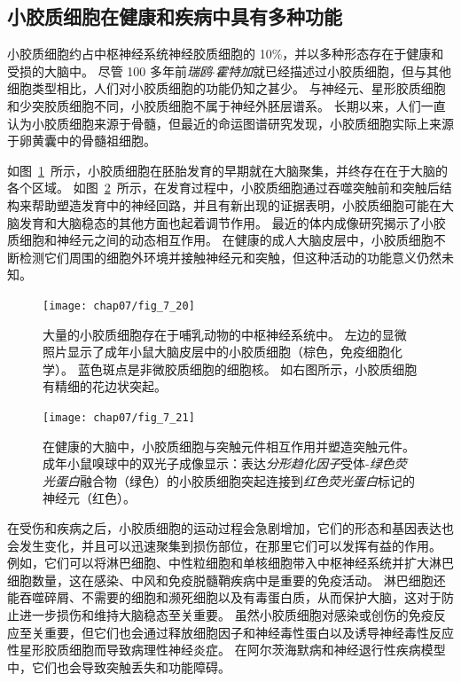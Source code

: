\subsection{小胶质细胞在健康和疾病中具有多种功能}

小胶质细胞约占中枢神经系统神经胶质细胞的 10\%，并以多种形态存在于健康和受损的大脑中。
尽管 100 多年前\textit{瑞鸥$\cdot$霍特加}就已经描述过小胶质细胞，但与其他细胞类型相比，人们对小胶质细胞的功能仍知之甚少。
与神经元、星形胶质细胞和少突胶质细胞不同，小胶质细胞不属于神经外胚层谱系。
长期以来，人们一直认为小胶质细胞来源于骨髓，但最近的命运图谱研究发现，小胶质细胞实际上来源于卵黄囊中的骨髓祖细胞。


如图~\ref{fig:7_20}~所示，小胶质细胞在胚胎发育的早期就在大脑聚集，并终存在在于大脑的各个区域。
如图~\ref{fig:7_21}~所示，在发育过程中，小胶质细胞通过吞噬突触前和突触后结构来帮助塑造发育中的神经回路，并且有新出现的证据表明，小胶质细胞可能在大脑发育和大脑稳态的其他方面也起着调节作用。
最近的体内成像研究揭示了小胶质细胞和神经元之间的动态相互作用。
在健康的成人大脑皮层中，小胶质细胞不断检测它们周围的细胞外环境并接触神经元和突触，但这种活动的功能意义仍然未知。


\begin{figure}[htbp]
	\centering
	\texttt{[image: chap07/fig\_7\_20]}
	\caption{大量的小胶质细胞存在于哺乳动物的中枢神经系统中。
		左边的显微照片显示了成年小鼠大脑皮层中的小胶质细胞（棕色，免疫细胞化学）。
		蓝色斑点是非微胶质细胞的细胞核。
		如右图所示，小胶质细胞有精细的花边状突起。}
	\label{fig:7_20}
\end{figure}


\begin{figure}[htbp]
	\centering
	\texttt{[image: chap07/fig\_7\_21]}
	\caption{在健康的大脑中，小胶质细胞与突触元件相互作用并塑造突触元件。
		成年小鼠嗅球中的双光子成像显示：表达\textit{分形趋化因子}受体-\textit{绿色荧光蛋白}融合物（绿色）的小胶质细胞突起连接到\textit{红色荧光蛋白}标记的神经元（红色）。}
	\label{fig:7_21}
\end{figure}


在受伤和疾病之后，小胶质细胞的运动过程会急剧增加，它们的形态和基因表达也会发生变化，并且可以迅速聚集到损伤部位，在那里它们可以发挥有益的作用。
例如，它们可以将淋巴细胞、中性粒细胞和单核细胞带入中枢神经系统并扩大淋巴细胞数量，这在感染、中风和免疫脱髓鞘疾病中是重要的免疫活动。
淋巴细胞还能吞噬碎屑、不需要的细胞和濒死细胞以及有毒蛋白质，从而保护大脑，这对于防止进一步损伤和维持大脑稳态至关重要。
虽然小胶质细胞对感染或创伤的免疫反应至关重要，但它们也会通过释放细胞因子和神经毒性蛋白以及诱导神经毒性反应性星形胶质细胞而导致病理性神经炎症。
在阿尔茨海默病和神经退行性疾病模型中，它们也会导致突触丢失和功能障碍。


